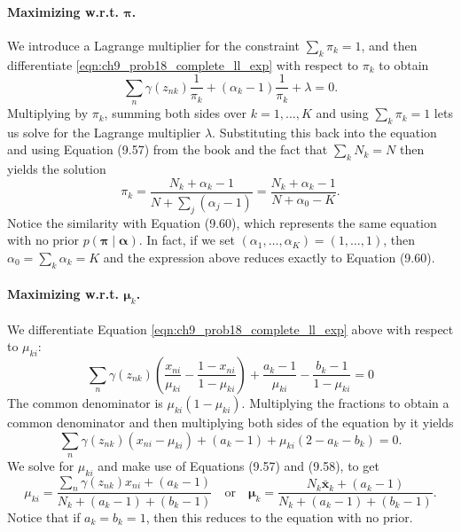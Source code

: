\documentclass[12pt, a4paper]{article}
\newcommand{\vect}[1]{\bm{#1}}
\begin{document}
\paragraph{Maximizing w.r.t. $\vect{\pi}$.} 
We introduce a Lagrange multiplier for the constraint $\sum_k \pi_k = 1$, and then differentiate \eqref{eqn:ch9_prob18_complete_ll_exp} with respect to $\pi_k$ to obtain
\begin{equation*}
	\sum_{n} \gamma(z_{nk}) \frac{1}{\pi_k}
	+
	(\alpha_k - 1) \frac{1}{\pi_k}
		+ \lambda
		=0.
\end{equation*}
Multiplying by $\pi_k$, summing both sides over $k=1, \ldots, K$ and using $\sum_k \pi_k = 1$ lets us solve for the Lagrange multiplier $\lambda$.
Substituting this back into the equation and using Equation (9.57) from the book and the fact that $\sum_k N_k = N$ then yields the solution
\begin{equation*}
	\pi_k = \frac{N_k + \alpha_k - 1}{N + \sum_j (\alpha_j - 1)}
	=
	\frac{N_k + \alpha_k - 1}{N + \alpha_0 - K}.
\end{equation*}
Notice the similarity with Equation (9.60), which represents the same equation with no prior $p(\vect{\pi} \mid \vect{\alpha})$.
In fact, if we set $(\alpha_1, \ldots, \alpha_K) = (1, \ldots, 1)$, then $\alpha_0 = \sum_k \alpha_k = K$ and the expression above reduces exactly to Equation (9.60).

\paragraph{Maximizing w.r.t. $\vect{\mu}_k$.} 
We differentiate Equation \eqref{eqn:ch9_prob18_complete_ll_exp} above with respect to $\mu_{ki}$:
\begin{equation*}
	\sum_n \gamma(z_{nk}) 
	\left( 
	\frac{x_{ni}}{\mu_{ki}}
	-
	\frac{1 - x_{ni}}{1 - \mu_{ki}}
	\right)
	+
	\frac{a_k - 1}{\mu_{ki}}
	 -
	 \frac{b_k - 1}{1 - \mu_{ki}} = 0
\end{equation*}
The common denominator is $\mu_{ki}(1 - \mu_{ki})$.
Multiplying the fractions to obtain a common denominator and then multiplying both sides of the equation by it yields
\begin{equation*}
	\sum_n \gamma(z_{nk})  \left( x_{ni} - \mu_{ki} \right)
	+
	(a_k - 1) + \mu_{ki}(2 - a_k - b_k) = 0.
\end{equation*}
We solve for $\mu_{ki}$ and make use of Equations (9.57) and (9.58), to get
\begin{equation*}
	\mu_{ki} = \frac{\sum_n \gamma(z_{nk}) x_{ni} + (a_k - 1)  }
	{N_k + (a_k - 1) + (b_k - 1)}
	\quad \text{or} \quad 
	\vect{\mu}_k = \frac{N_k \bar{\vect{x}}_k + (a_k - 1)  }
	{N_k + (a_k - 1) + (b_k - 1)}.
\end{equation*}
Notice that if $a_k = b_k= 1$, then this reduces to the equation with no prior.
\end{document}
